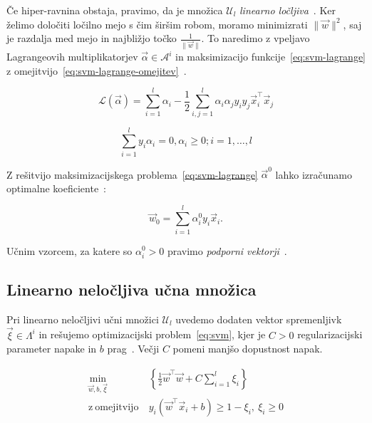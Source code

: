 Če hiper-ravnina obstaja, pravimo, da je množica $\mathcal{U}_l$ \emph{linearno ločljiva}~\cite{chapelle1999support}. Ker želimo določiti ločilno mejo s čim širšim robom, moramo minimizrati $\|\vec{w}\|^2$, saj je razdalja med mejo in najbližjo točko $\frac{1}{\|\vec{w}\|}$. To naredimo z vpeljavo Lagrangeovih multiplikatorjev $\vec{\alpha} \in \mathcal{A}^i$ in maksimizacijo funkcije~\eqref{eq:svm-lagrange} z omejitvijo~\eqref{eq:svm-lagrange-omejitev}~\cite{chapelle1999support}.

\begin{equation}\label{eq:svm-lagrange}
	\mathcal{L}(\vec{\alpha}) = \sum_{i=1}^l \alpha_i - \frac{1}{2}\sum_{i,j=1}^l \alpha_i\alpha_j y_i y_j \vec{x}_i^\top\vec{x}_j
\end{equation}

\begin{equation}\label{eq:svm-lagrange-omejitev}
	\sum_{i=1}^ly_i\alpha_i = 0, \alpha_i \geq 0; i=1, \ldots, l
\end{equation}

Z rešitvijo maksimizacijskega problema~\eqref{eq:svm-lagrange} $\vec{\alpha}^0$ lahko izračunamo optimalne koeficiente~\cite{chapelle1999support}:

\begin{equation}
	\vec{w}_0 = \sum_{i=1}^l \alpha_i^0 y_i \vec{x}_i.
\end{equation}

Učnim vzorcem, za katere so $\alpha_i^0 > 0$ pravimo \emph{podporni vektorji}~\cite{chapelle1999support}.









\subsection{Linearno neločljiva učna množica}
Pri linearno neločljivi učni množici $\mathcal{U}_l$ uvedemo dodaten vektor spremenljivk $\vec{\xi} \in \mathit{\Lambda}^i$ in rešujemo optimizacijski problem~\eqref{eq:svm}, kjer je $C>0$ regularizacijski parameter napake in $b$ prag~\cite{chapelle1999support}. Večji $C$ pomeni manjšo dopustnost napak. 

\begin{equation}\label{eq:svm}
\begin{aligned}
\min_{\vec{w}, b, \vec{\xi}} &~ \left\{ \frac{1}{2} \vec{w}^\top\vec{w} + C \sum_{i=1}^l\xi_i \right\}\\
    \mathrm{z~omejitvijo} &~ y_i \left( \vec{w}^\top \vec{x}_i + b \right) \geq 1 - \xi_i,~ 
    \xi_i \geq 0
\end{aligned}	
\end{equation}








